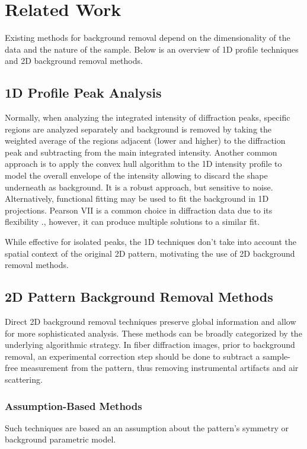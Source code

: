 \documentclass[iucr,review]{iucrjournals}
\begin{document}
\section{Related Work}

Existing methods for background removal depend on the dimensionality of the data
and the nature of the sample. Below is an overview of 1D profile techniques and
2D background removal methods.

\subsection{1D Profile Peak Analysis}

Normally, when analyzing the integrated intensity of diffraction peaks, 
specific regions are analyzed separately and background is removed by taking the weighted average of the regions adjacent
(lower and higher) to the diffraction peak and subtracting from the main integrated intensity. \cite{NederKorsunskiy2018}
Another common approach is to apply the convex hull algorithm to the 1D intensity profile to model the overall envelope
of the intensity allowing to discard the shape underneath as background.
It is a robust approach, but sensitive to noise.
Alternatively, functional fitting may be used to fit the background in 1D projections.
Pearson VII is a common choice in diffraction data due to its flexibility \cite{NA}.,
however, it can produce multiple solutions to a similar fit. \cite{Zorn1988}

While effective for isolated peaks, the 1D techniques don't take into account the spatial context of the original 2D pattern,
motivating the use of 2D background removal methods.

\subsection{2D Pattern Background Removal Methods}

Direct 2D background removal techniques preserve global information and
allow for more sophisticated analysis.
These methods can be broadly categorized by the underlying algorithmic strategy.
In fiber diffraction images, prior to background removal, 
an experimental correction step should be done to subtract
a sample-free measurement from the pattern,
thus removing instrumental artifacts and air scattering.

    \subsubsection{Assumption-Based Methods}
        Such techniques are based an an assumption about the pattern's symmetry or background parametric model.
\end{document}
